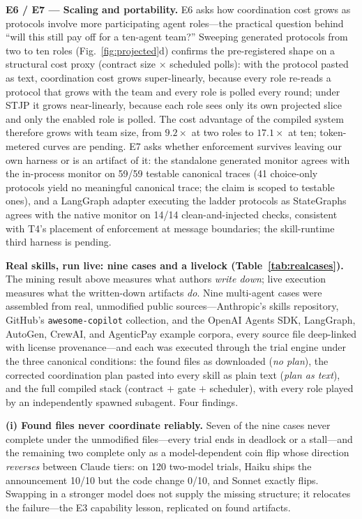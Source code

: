 \documentclass{article}
\newcommand{\stjp}{\textsc{STJP}}
\begin{document}
\textbf{E6 / E7 --- Scaling and portability.} E6 asks how coordination cost grows as protocols involve more participating agent roles---the practical question behind ``will this still pay off for a ten-agent team?'' Sweeping generated protocols from two to ten roles (Fig.~\ref{fig:projected}d) confirms the pre-registered shape on a structural cost proxy (contract size $\times$ scheduled polls): with the protocol pasted as text, coordination cost grows super-linearly, because every role re-reads a protocol that grows with the team and every role is polled every round; under \stjp{} it grows near-linearly, because each role sees only its own projected slice and only the enabled role is polled. The cost advantage of the compiled system therefore grows with team size, from $9.2\times$ at two roles to $17.1\times$ at ten; token-metered curves are pending. E7 asks whether enforcement survives leaving our own harness or is an artifact of it: the standalone generated monitor agrees with the in-process monitor on 59/59 testable canonical traces (41 choice-only protocols yield no meaningful canonical trace; the claim is scoped to testable ones), and a LangGraph adapter executing the ladder protocols as StateGraphs agrees with the native monitor on 14/14 clean-and-injected checks, consistent with T4's placement of enforcement at message boundaries; the skill-runtime third harness is pending.

\textbf{Real skills, run live: nine cases and a livelock (Table~\ref{tab:realcases}).}\label{sec:real} The mining result above measures what authors \emph{write down}; live execution measures what the written-down artifacts \emph{do}. Nine multi-agent cases were assembled from real, unmodified public sources---Anthropic's skills repository, GitHub's \texttt{awesome-copilot} collection, and the OpenAI Agents SDK, LangGraph, AutoGen, CrewAI, and AgenticPay example corpora, every source file deep-linked with license provenance---and each was executed through the trial engine under the three canonical conditions: the found files as downloaded (\emph{no plan}), the corrected coordination plan pasted into every skill as plain text (\emph{plan as text}), and the full compiled stack (contract $+$ gate $+$ scheduler), with every role played by an independently spawned subagent. Four findings.

\textbf{(i) Found files never coordinate reliably.} Seven of the nine cases never complete under the unmodified files---every trial ends in deadlock or a stall---and the remaining two complete only as a model-dependent coin flip whose direction \emph{reverses} between Claude tiers: on 120 two-model trials, Haiku ships the announcement 10/10 but the code change 0/10, and Sonnet exactly flips. Swapping in a stronger model does not supply the missing structure; it relocates the failure---the E3 capability lesson, replicated on found artifacts.
\end{document}
